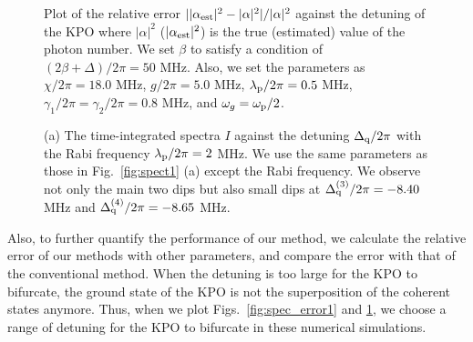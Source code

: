  

\begin{figure}%
\centering
\caption{
Plot of 
the relative error $||\alpha_{\rm{est}}|^2-|\alpha|^2|/|\alpha|^2$ 
against the detuning of the KPO
 where $|\alpha|^2$ ($|\alpha_{\rm{est}}|^2$) is the true (estimated) value of the photon number.
We set $\beta$ to satisfy a condition of $(2\beta + \Delta)/2\pi = 50$ MHz.
Also, we set the parameters as $\chi/2\pi=18.0$ MHz, $g/2\pi=5.0$ MHz, $\lambda_{\rm{p}}/2\pi=0.5$ MHz, $\gamma_1/2\pi=\gamma_2/2\pi=0.8$ MHz, and $\omega_g=\omega_{\rm{p}}/2$.
}
\label{fig:spec_error2}
\end{figure}

\begin{figure}%
\centering
\caption{
(a) The time-integrated spectra $I$ against the detuning $\Delta_{\rm{q}}/2\pi$ with the Rabi frequency $\lambda_{\rm{p}}/2\pi=2$  MHz.
We use the same parameters as those in Fig.~\ref{fig:spect1} (a) except the Rabi frequency. 
We observe not only the main two dips but also small dips
at $\Delta _{\rm{q}}^{(3)}/2\pi=-8.40$ MHz and $\Delta _{\rm{q}}^{(4)}/2\pi=-8.65$ MHz. }

\label{fig:spec2}
\end{figure}

Also, to further quantify the performance of our method,
we calculate the relative error of our methods with other parameters, and compare the error with that of the conventional method.
When the detuning is too large for the KPO to bifurcate, the ground state of the KPO is not the superposition of the coherent states anymore. Thus, when we plot Figs.~\ref{fig:spec_error1} and \ref{fig:spec_error2}, we choose a range of detuning for the KPO to bifurcate in these numerical simulations.

